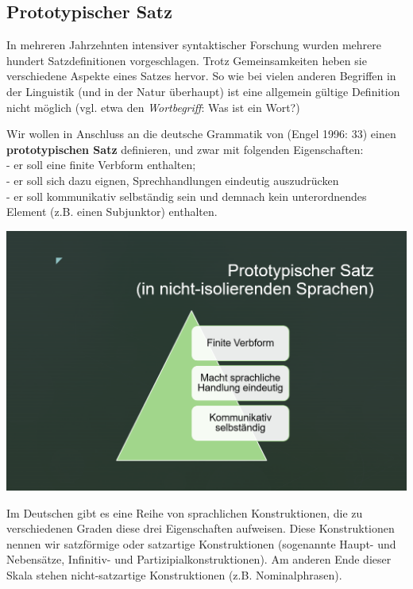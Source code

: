 \documentclass[
  letterpaper,
]{scrbook}
\begin{document}
\hypertarget{prototypischer-satz}{%
\subsection{Prototypischer Satz}\label{prototypischer-satz}}

In mehreren Jahrzehnten intensiver syntaktischer Forschung wurden
mehrere hundert Satzdefinitionen vorgeschlagen. Trotz Gemeinsamkeiten
heben sie verschiedene Aspekte eines Satzes hervor. So wie bei vielen
anderen Begriffen in der Linguistik (und in der Natur überhaupt) ist
eine allgemein gültige Definition nicht möglich (vgl. etwa den
\emph{Wortbegriff}: Was ist ein Wort?)

Wir wollen in Anschluss an die deutsche Grammatik von (Engel 1996: 33)
einen \textbf{prototypischen Satz} definieren, und zwar mit folgenden
Eigenschaften:\\
- er soll eine finite Verbform enthalten;\\
- er soll sich dazu eignen, Sprechhandlungen eindeutig auszudrücken\\
- er soll kommunikativ selbständig sein und demnach kein unterordnendes
Element (z.B. einen Subjunktor) enthalten.

\includegraphics[width=1\textwidth,height=\textheight]{./pictures/satzdefinition.png}

Im Deutschen gibt es eine Reihe von sprachlichen Konstruktionen, die zu
verschiedenen Graden diese drei Eigenschaften aufweisen. Diese
Konstruktionen nennen wir satzförmige oder satzartige Konstruktionen
(sogenannte Haupt- und Nebensätze, Infinitiv- und
Partizipialkonstruktionen). Am anderen Ende dieser Skala stehen
nicht-satzartige Konstruktionen (z.B. Nominalphrasen).
\end{document}
